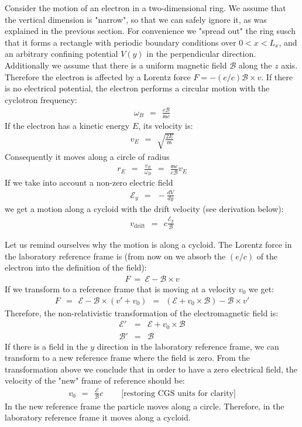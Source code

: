 \documentclass[onecolumn,fleqn, 11pt]{revtex4}
\newcommand{\mass}{\mathsf{m}}
\newcommand{\beq}{\begin{eqnarray}}
\newcommand{\eeq}{\end{eqnarray}}
\begin{document}
Consider the motion of an electron in 
a two-dimensional ring. We assume that 
the vertical dimension is "narrow", 
so that we can safely ignore it, as was explained 
in the previous section. For convenience  
we "spread out" the ring susch that it forms a rectangle 
with periodic boundary conditions over ${0<x<L_x}$, 
and an arbitrary confining potential ${V(y)}$ 
in the perpendicular direction. 
Additionally we assume that there is a uniform 
magnetic field ${\mathcal{B}}$ along the $z$ axis. 
Therefore the electron is affected by 
a Lorentz force ${F = - (e/c) \mathcal{B} \times v}$. 
If there is no electrical potential, the electron 
performs a circular motion with the cyclotron frequency:
\beq
\omega_B \ \ = \ \ \frac{e\mathcal{B}}{\mass c} 
\eeq
If the electron has a kinetic energy ${E}$, its velocity is:
\beq
v_E \ \ = \ \ \sqrt{ \frac{2E}{\mass}} 
\eeq
Consequently it moves along a circle of radius
\beq
r_E \ \ = \ \ \frac{v_E}{\omega_B} \ \ = \ \ \frac{\mass c}{e\mathcal{B}}v_E 
\eeq
If we take into account a non-zero electric field
\beq
\mathcal{E}_y \ \  = \ \ -\frac{dV}{dy} 
\eeq
we get a motion along a cycloid with the 
drift velocity (see derivation below):
\beq
v_{\mbox{drift}} \ \ = \ \ c\frac{\mathcal{E}_y}{\mathcal{B}} 
\eeq



Let us remind ourselves why the motion is along 
a cycloid. The Lorentz force in the laboratory reference 
frame is (from now on we absorb the $(e/c)$
of the electron into the definition of the field):
\beq
F \ = \ \mathcal{E} - \mathcal{B} \times v 
\eeq
If we transform to a reference frame 
that is moving at a velocity ${v_0}$ we get:
\beq
F \ \ = \ \ \mathcal{E} - \mathcal{B} \times ( v' + v_0 ) 
\ \ = \ \ (\mathcal{E} + v_0 \times \mathcal{B}) - \mathcal{B} \times v' 
\eeq
Therefore, the non-relativistic transformation 
of the electromagnetic field is:
\beq
\mathcal{E}' &=& \mathcal{E} + v_0 \times \mathcal{B} 
\\ \nonumber
\mathcal{B}' &=& \mathcal{B} 
\eeq
If there is a field in the $y$ direction in the laboratory reference frame, 
we can transform to a new reference frame where the field is zero. 
From the transformation above we conclude that in order 
to have a zero electrical field, the velocity of the "new" 
frame of reference should be: 
\beq
v_0 \ \ = \ \ \frac{\mathcal{E}}{\mathcal{B}}c \ \ \ \ \ \ \ \ \ \ \text{[restoring CGS units for clarity]} 
\eeq
In the new reference frame the particle 
moves along a circle. Therefore, in the laboratory 
reference frame it moves along a cycloid. 
\end{document}
